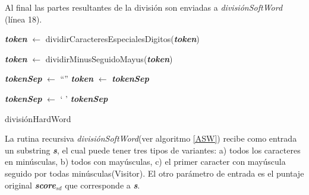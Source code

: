 \documentclass[a4paper,12pt]{report}
\begin{document}
Al final las partes resultantes de la división son enviadas a \mbox{\textit{divisiónSoftWord}} (línea 18).

\begin{algorithm}
\LinesNumbered%
\BlankLine
\textbf{\textit{token}} $\leftarrow $ dividirCaracteresEspecialesDigitos(\textbf{\textit{token}})

\textbf{\textit{token}} $\leftarrow $ dividirMinusSeguidoMayus(\textbf{\textit{token}})

\textbf{\textit{tokenSep}} $\leftarrow $ “”
\BlankLine
{}
\BlankLine
\textbf{\textit{token}} $\leftarrow$ \textbf{\textit{tokenSep}}

\textbf{\textit{tokenSep}} $\leftarrow$ ` '
\BlankLine
{}
\BlankLine
\Return \textbf{\textit{tokenSep}}

\caption{divisiónHardWord \label{AHW}}
\end{algorithm}

La rutina recursiva \textit{divisiónSoftWord}(ver algoritmo \ref{ASW}) recibe como entrada un substring \textbf{\textit{s}}, el cual puede tener tres tipos de variantes: a) todos los caracteres en minúsculas, b) todos con mayúsculas, c) el primer caracter con mayúscula seguido por todas minúsculas(\textsf{Visitor}). El otro parámetro de entrada es el puntaje original \textbf{\textit{score$_{sd}$}} que corresponde a  \textbf{\textit{s}}.
\end{document}
